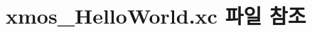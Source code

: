 \hypertarget{xmos___hello_world_8xc}{\section{xmos\+\_\+\+Hello\+World.\+xc 파일 참조}
\label{xmos___hello_world_8xc}
}
